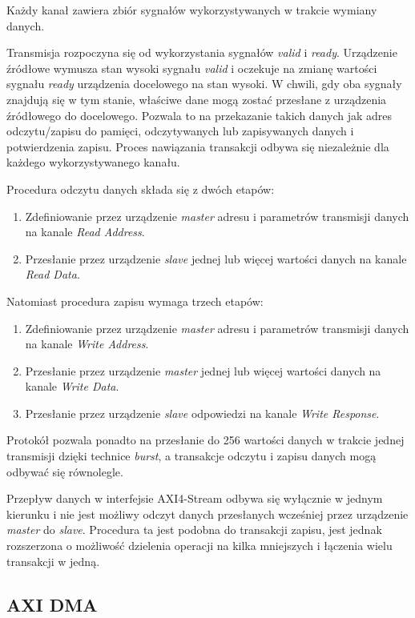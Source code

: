 Każdy kanał zawiera zbiór sygnałów wykorzystywanych w trakcie wymiany danych.

Transmisja rozpoczyna się od wykorzystania sygnałów \emph{valid} i \emph{ready}. 
Urządzenie źródłowe wymusza stan wysoki sygnału \emph{valid} i oczekuje na zmianę wartości sygnału \emph{ready} urządzenia docelowego na stan wysoki. 
W chwili, gdy oba sygnały znajdują się w tym stanie, właściwe dane mogą zostać przesłane z urządzenia źródłowego do docelowego. 
Pozwala to na przekazanie takich danych jak adres odczytu/zapisu do pamięci, odczytywanych lub zapisywanych danych i potwierdzenia zapisu. 
Proces nawiązania transakcji odbywa się niezależnie dla każdego wykorzystywanego kanału.

Procedura odczytu danych składa się z dwóch etapów:
\begin{enumerate}
	\item Zdefiniowanie  przez urządzenie \emph{master} adresu i parametrów transmisji danych na kanale \emph{Read Address}.
	\item Przesłanie przez urządzenie \emph{slave} jednej lub więcej wartości danych na kanale \emph{Read Data}.
\end{enumerate}

Natomiast procedura zapisu wymaga trzech etapów:
\begin{enumerate}
	\item Zdefiniowanie  przez urządzenie \emph{master} adresu i parametrów transmisji danych na kanale \emph{Write Address}.
	\item Przesłanie przez urządzenie \emph{master} jednej lub więcej wartości danych na kanale \emph{Write Data}.
	\item Przesłanie przez urządzenie \emph{slave} odpowiedzi na kanale \emph{Write Response}.
\end{enumerate}

Protokół pozwala ponadto na przesłanie do 256 wartości danych w trakcie jednej transmisji dzięki technice \emph{burst}, a transakcje odczytu i zapisu danych mogą odbywać się równolegle.

Przepływ danych w interfejsie AXI4-Stream odbywa się wyłącznie w jednym kierunku i nie jest możliwy odczyt danych przesłanych wcześniej przez urządzenie \emph{master} do \emph{slave}. 
Procedura ta jest podobna do transakcji zapisu, jest jednak rozszerzona o możliwość dzielenia operacji na kilka mniejszych i łączenia wielu transakcji w jedną.

\subsection{AXI DMA}

